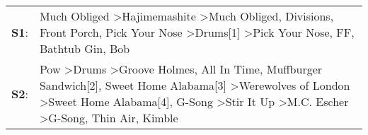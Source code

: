 \begin{supertabular}{p{0.03\textwidth}p{0.92\textwidth}}
 \textbf{S1}:  &                                                                                                                                                                                   Much Obliged\textsuperscript{} \textgreater \enspace Hajimemashite\textsuperscript{} \textgreater \enspace Much Obliged\textsuperscript{}, \enspace Divisions\textsuperscript{}, \enspace Front Porch\textsuperscript{}, \enspace Pick Your Nose\textsuperscript{} \textgreater \enspace Drums[1]\textsuperscript{} \textgreater \enspace Pick Your Nose\textsuperscript{}, \enspace FF\textsuperscript{}, \enspace Bathtub Gin\textsuperscript{}, \enspace Bob\textsuperscript{}  \enspace  \\
 \textbf{S2}:  &  Pow\textsuperscript{} \textgreater \enspace Drums\textsuperscript{} \textgreater \enspace Groove Holmes\textsuperscript{}, \enspace All In Time\textsuperscript{}, \enspace Muffburger Sandwich[2]\textsuperscript{}, \enspace Sweet Home Alabama[3]\textsuperscript{} \textgreater \enspace Werewolves of London\textsuperscript{} \textgreater \enspace Sweet Home Alabama[4]\textsuperscript{}, \enspace G-Song\textsuperscript{} \textgreater \enspace Stir It Up\textsuperscript{} \textgreater \enspace M.C. Escher\textsuperscript{} \textgreater \enspace G-Song\textsuperscript{}, \enspace Thin Air\textsuperscript{}, \enspace Kimble\textsuperscript{}  \enspace  \\
\end{supertabular}
